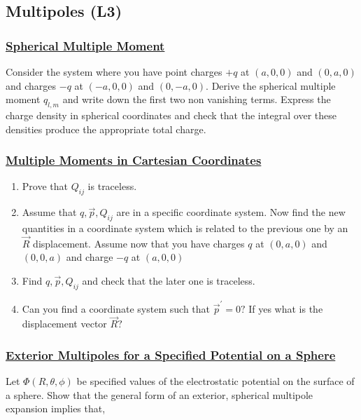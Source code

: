 \subsection{Multipoles (\textbf{L3})}

\subsubsection{\hyperref[Spherical Multiple Moment]{Spherical Multiple Moment}}

Consider the system where you have point charges $+q$ at $(a, 0,0)$ and $(0, a, 0)$ and charges $-q$ at $(-a, 0,0)$ and $(0,-a, 0)$. Derive the spherical multiple moment $q_{l, m}$ and write down the first two non vanishing terms. Express the charge density in spherical coordinates and check that the integral over these densities produce the appropriate total charge.

\subsubsection{\hyperref[Multiple Moments in Cartesian Coordinates]{Multiple Moments in Cartesian Coordinates}}

\begin{enumerate}
	\item Prove that $Q_{i j}$ is traceless.
	\item Assume that $q, \vec{p}, Q_{i j}$ are in a specific coordinate system. Now find the new quantities in a coordinate system which is related to the previous one by an $\vec{R}$ displacement.
	Assume now that you have charges $q$ at $(0, a, 0)$ and $(0,0, a)$ and charge $-q$ at $(a, 0,0)$
	\item Find $q, \vec{p}, Q_{i j}$ and check that the later one is traceless.
	\item Can you find a coordinate system such that $\vec{p}^{\prime}=0 ?$ If yes what is the displacement vector $\vec{R} ?$
\end{enumerate}

\subsubsection{\hyperref[Exterior Multipoles for a Specified Potential on a Sphere]{Exterior Multipoles for a Specified Potential on a Sphere}} 

Let $\Phi (R, \theta,\phi)$ be specified values of the electrostatic potential on the surface of a sphere. Show that the general form of an exterior, spherical multipole expansion implies that,

